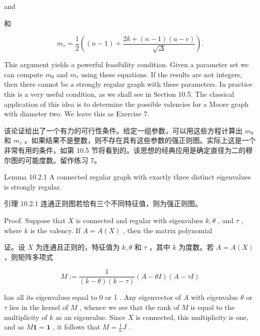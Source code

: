 \documentclass[10pt]{article}
\begin{document}
and

\begin{tcolorbox}\relax
和
\end{tcolorbox}

\[
{m}_{\tau } = \frac{1}{2}\left( {\left( {n - 1}\right)  + \frac{{2k} + \left( {n - 1}\right) \left( {a - c}\right) }{\sqrt{\Delta }}}\right) .
\]

This argument yields a powerful feasibility condition. Given a parameter set we can compute \({m}_{\theta }\) and \({m}_{\tau }\) using these equations. If the results are not integers, then there cannot be a strongly regular graph with these parameters. In practice this is a very useful condition, as we shall see in Section 10.5. The classical application of this idea is to determine the possible valencies for a Moore graph with diameter two. We leave this as Exercise 7.

\begin{tcolorbox}\relax
该论证给出了一个有力的可行性条件。给定一组参数，可以用这些方程计算出 \({m}_{\theta }\) 和 \({m}_{\tau }\) 。如果结果不是整数，则不存在具有这些参数的强正则图。实际上这是一个非常有用的条件，如第 10.5 节将看到的。该思想的经典应用是确定直径为二的穆尔图的可能度数。留作练习 7。
\end{tcolorbox}

Lemma 10.2.1 A connected regular graph with exactly three distinct eigenvalues is strongly regular.

\begin{tcolorbox}\relax
引理 10.2.1 连通正则图若恰有三个不同特征值，则为强正则图。
\end{tcolorbox}

Proof. Suppose that \(X\) is connected and regular with eigenvalues \(k,\theta\) , and \(\tau\) , where \(k\) is the valency. If \(A = A\left( X\right)\) , then the matrix polynomial

\begin{tcolorbox}\relax
证。设 \(X\) 为连通且正则的，特征值为 \(k,\theta\) 和 \(\tau\) ，其中 \(k\) 为度数。若 \(A = A\left( X\right)\) ，则矩阵多项式
\end{tcolorbox}

\[
M \mathrel{\text{ := }} \frac{1}{\left( {k - \theta }\right) \left( {k - \tau }\right) }\left( {A - {\theta I}}\right) \left( {A - {\tau I}}\right)
\]

has all its eigenvalues equal to 0 or 1 . Any eigenvector of \(A\) with eigenvalue \(\theta\) or \(\tau\) lies in the kernel of \(M\) , whence we see that the rank of \(M\) is equal to the multiplicity of \(k\) as an eigenvalue. Since \(X\) is connected, this multiplicity is one, and as \(M\mathbf{1} = \mathbf{1}\) , it follows that \(M = \frac{1}{n}J\) .
\end{document}
